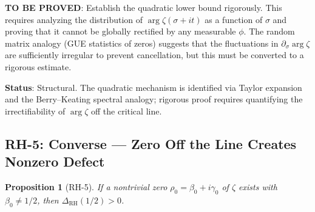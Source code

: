 \documentclass[11pt]{article}
\newtheorem{proposition}[theorem]{Proposition}
\theoremstyle{remark}
\begin{document}
\textbf{TO BE PROVED}: Establish the quadratic lower bound rigorously.
This requires analyzing the distribution of $\arg\zeta(\sigma+it)$ as a function of
$\sigma$ and proving that it cannot be globally rectified by any measurable $\phi$.
The random matrix analogy (GUE statistics of zeros) suggests that the fluctuations in
$\partial_\sigma\arg\zeta$ are sufficiently irregular to prevent cancellation, but this
must be converted to a rigorous estimate.

\medskip
\noindent\textbf{Status}: Structural.  The quadratic mechanism is identified via Taylor
expansion and the Berry--Keating spectral analogy; rigorous proof requires quantifying
the irrectifiability of $\arg\zeta$ off the critical line.

\subsection{RH-5: Converse --- Zero Off the Line Creates Nonzero Defect}
\label{subsec:RH5}

\begin{proposition}[RH-5]
If a nontrivial zero $\rho_0=\beta_0+i\gamma_0$ of $\zeta$ exists with
$\beta_0\neq 1/2$, then $\Delta_{\mathrm{RH}}(1/2)>0$.
\end{proposition}
\end{document}
